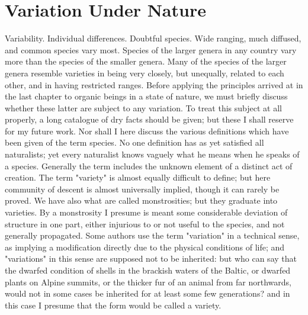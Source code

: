 \chapter{Variation Under Nature}
Variability. Individual differences. Doubtful species. Wide ranging, much diffused, and common species vary most. Species of the larger genera in any country vary more than the species of the smaller genera. Many of the species of the larger genera resemble varieties in being very closely, but unequally, related to each other, and in having restricted ranges.
Before applying the principles arrived at in the last chapter to organic beings in a state of nature, we must briefly discuss whether these latter are subject to any variation. To treat this subject at all properly, a long catalogue of dry facts should be given; but these I shall reserve for my future work. Nor shall I here discuss the various definitions which have been given of the term species. No one definition has as yet satisfied all naturalists; yet every naturalist knows vaguely what he means when he speaks of a species. Generally the term includes the unknown element of a distinct act of creation. The term "variety" is almost equally difficult to define; but here community of descent is almost universally implied, though it can rarely be proved. We have also what are called monstrosities; but they graduate into varieties. By a monstrosity I presume is meant some considerable deviation of structure in one part, either injurious to or not useful to the species, and not generally propagated. Some authors use the term "variation" in a technical sense, as implying a modification directly due to the physical conditions of life; and "variations" in this sense are supposed not to be inherited: but who can say that the dwarfed condition of shells in the brackish waters of the Baltic, or dwarfed plants on Alpine summits, or the thicker fur of an animal from far northwards, would not in some cases be inherited for at least some few generations? and in this case I presume that the form would be called a variety.
